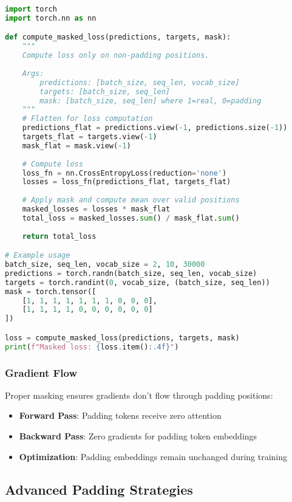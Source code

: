 \begin{example}
\begin{lstlisting}[language=Python]
import torch
import torch.nn as nn

def compute_masked_loss(predictions, targets, mask):
    """
    Compute loss only on non-padding positions.
    
    Args:
        predictions: [batch_size, seq_len, vocab_size]
        targets: [batch_size, seq_len]
        mask: [batch_size, seq_len] where 1=real, 0=padding
    """
    # Flatten for loss computation
    predictions_flat = predictions.view(-1, predictions.size(-1))
    targets_flat = targets.view(-1)
    mask_flat = mask.view(-1)
    
    # Compute loss
    loss_fn = nn.CrossEntropyLoss(reduction='none')
    losses = loss_fn(predictions_flat, targets_flat)
    
    # Apply mask and compute mean over valid positions
    masked_losses = losses * mask_flat
    total_loss = masked_losses.sum() / mask_flat.sum()
    
    return total_loss

# Example usage
batch_size, seq_len, vocab_size = 2, 10, 30000
predictions = torch.randn(batch_size, seq_len, vocab_size)
targets = torch.randint(0, vocab_size, (batch_size, seq_len))
mask = torch.tensor([
    [1, 1, 1, 1, 1, 1, 1, 0, 0, 0],
    [1, 1, 1, 1, 0, 0, 0, 0, 0, 0]
])

loss = compute_masked_loss(predictions, targets, mask)
print(f"Masked loss: {loss.item():.4f}")
\end{lstlisting}
\end{example}

\subsubsection{Gradient Flow}
Proper masking ensures gradients don't flow through padding positions:
\begin{itemize}
\item \textbf{Forward Pass}: Padding tokens receive zero attention
\item \textbf{Backward Pass}: Zero gradients for padding token embeddings
\item \textbf{Optimization}: Padding embeddings remain unchanged during training
\end{itemize}

\subsection{Advanced Padding Strategies}

